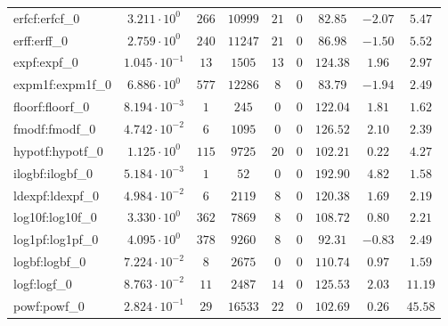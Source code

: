 \begin{tabular}{|l|c|c|c|c|c|c|c|c|}
erfcf:erfcf\_0               & $ 3.211 \cdot 10^{0}  $ & $ 266    $ & $ 10999  $ & $ 21  $ & $ 0    $ & $ 82.85       $ & $ -2.07   $ & $ 5.47    $ \\
erff:erff\_0                 & $ 2.759 \cdot 10^{0}  $ & $ 240    $ & $ 11247  $ & $ 21  $ & $ 0    $ & $ 86.98       $ & $ -1.50   $ & $ 5.52    $ \\
expf:expf\_0                 & $ 1.045 \cdot 10^{-1} $ & $ 13     $ & $ 1505   $ & $ 13  $ & $ 0    $ & $ 124.38      $ & $ 1.96    $ & $ 2.97    $ \\
expm1f:expm1f\_0             & $ 6.886 \cdot 10^{0}  $ & $ 577    $ & $ 12286  $ & $ 8   $ & $ 0    $ & $ 83.79       $ & $ -1.94   $ & $ 2.49    $ \\
floorf:floorf\_0             & $ 8.194 \cdot 10^{-3} $ & $ 1      $ & $ 245    $ & $ 0   $ & $ 0    $ & $ 122.04      $ & $ 1.81    $ & $ 1.62    $ \\
fmodf:fmodf\_0               & $ 4.742 \cdot 10^{-2} $ & $ 6      $ & $ 1095   $ & $ 0   $ & $ 0    $ & $ 126.52      $ & $ 2.10    $ & $ 2.39    $ \\
hypotf:hypotf\_0             & $ 1.125 \cdot 10^{0}  $ & $ 115    $ & $ 9725   $ & $ 20  $ & $ 0    $ & $ 102.21      $ & $ 0.22    $ & $ 4.27    $ \\
ilogbf:ilogbf\_0             & $ 5.184 \cdot 10^{-3} $ & $ 1      $ & $ 52     $ & $ 0   $ & $ 0    $ & $ 192.90      $ & $ 4.82    $ & $ 1.58    $ \\
ldexpf:ldexpf\_0             & $ 4.984 \cdot 10^{-2} $ & $ 6      $ & $ 2119   $ & $ 8   $ & $ 0    $ & $ 120.38      $ & $ 1.69    $ & $ 2.19    $ \\
log10f:log10f\_0             & $ 3.330 \cdot 10^{0}  $ & $ 362    $ & $ 7869   $ & $ 8   $ & $ 0    $ & $ 108.72      $ & $ 0.80    $ & $ 2.21    $ \\
log1pf:log1pf\_0             & $ 4.095 \cdot 10^{0}  $ & $ 378    $ & $ 9260   $ & $ 8   $ & $ 0    $ & $ 92.31       $ & $ -0.83   $ & $ 2.49    $ \\
logbf:logbf\_0               & $ 7.224 \cdot 10^{-2} $ & $ 8      $ & $ 2675   $ & $ 0   $ & $ 0    $ & $ 110.74      $ & $ 0.97    $ & $ 1.59    $ \\
logf:logf\_0                 & $ 8.763 \cdot 10^{-2} $ & $ 11     $ & $ 2487   $ & $ 14  $ & $ 0    $ & $ 125.53      $ & $ 2.03    $ & $ 11.19   $ \\
powf:powf\_0                 & $ 2.824 \cdot 10^{-1} $ & $ 29     $ & $ 16533  $ & $ 22  $ & $ 0    $ & $ 102.69      $ & $ 0.26    $ & $ 45.58   $ \\

\end{tabular}

